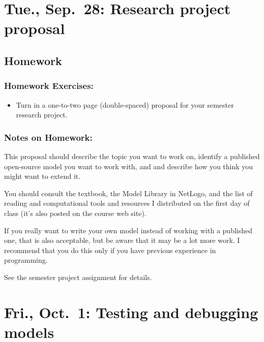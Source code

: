 \documentclass[
]{article}
\providecommand{\tightlist}{%
  \setlength{\itemsep}{0pt}\setlength{\parskip}{0pt}}
\begin{document}
\hypertarget{tue.-sep.-28-research-project-proposal}{%
\section{Tue., Sep.~28: Research project
proposal}\label{tue.-sep.-28-research-project-proposal}}

\hypertarget{homework-6}{%
\subsection{Homework}\label{homework-6}}

\hypertarget{homework-exercises-6}{%
\subsubsection{Homework Exercises:}\label{homework-exercises-6}}

\begin{itemize}
\tightlist
\item
  Turn in a one-to-two page (double-spaced) proposal for your semester
  research project.
\end{itemize}

\hypertarget{notes-on-homework-4}{%
\subsubsection{Notes on Homework:}\label{notes-on-homework-4}}

This proposal should describe the topic you want to work on, identify a
published open-source model you want to work with, and and describe how
you think you might want to extend it.

You should consult the textbook, the Model Library in NetLogo, and the
list of reading and computational tools and resources I distributed on
the first day of class (it's also posted on the course web site).

If you really want to write your own model instead of working with a
published one, that is also acceptable, but be aware that it may be a
lot more work. I recommend that you do this only if you have previous
experience in programming.

See the semester project assignment for details.

\hypertarget{fri.-oct.-1-testing-and-debugging-models}{%
\section{Fri., Oct.~1: Testing and debugging
models}\label{fri.-oct.-1-testing-and-debugging-models}}
\end{document}
